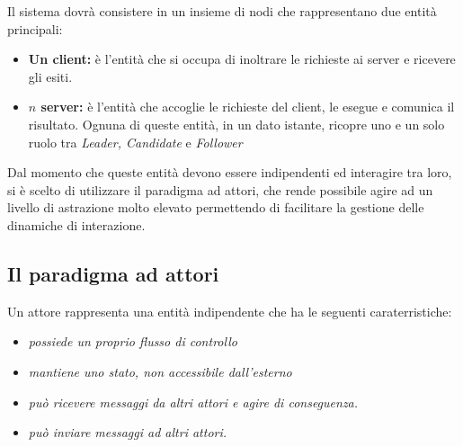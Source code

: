 Il sistema dovrà consistere in un insieme di nodi che rappresentano due entità principali:
	\begin{itemize}
		\item \textbf{Un client:} è l'entità che si occupa di inoltrare le richieste ai server e ricevere gli esiti.
		\item \textbf{$n$ server:} è l'entità che accoglie le richieste del client, le esegue e comunica il risultato. Ognuna di queste entità, in un dato istante, ricopre uno e un solo ruolo tra \textit{Leader, Candidate} e \textit{Follower}
	\end{itemize}

Dal momento che queste entità devono essere indipendenti ed interagire tra loro, si è scelto di utilizzare il paradigma ad attori, che rende possibile agire ad un livello di astrazione molto elevato permettendo di facilitare la gestione delle dinamiche di interazione.


	\subsection{Il paradigma ad attori}
	Un attore rappresenta una entità indipendente che ha le seguenti caraterristiche:
	\begin{itemize}
		\item \emph{possiede un proprio flusso di controllo}
		\item \emph{mantiene uno stato, non accessibile dall'esterno}
		\item \emph{può ricevere messaggi da altri attori e agire di conseguenza.}
		\item \emph{può inviare messaggi ad altri attori.}
	\end{itemize}
